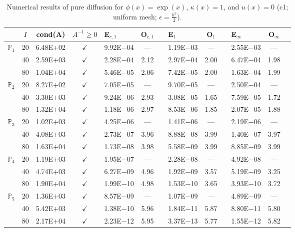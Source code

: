 \begin{table}[H]
\centering
\caption{Numerical results of pure diffusion for $\phi(x)=\exp(x)$, $\kappa(x)=1$, and $u(x)=0$ (c1; uniform mesh; $\epsilon=\frac{h^2}{2}$).}
\begin{tabular}{@{}l c c c l c c l c c l c c@{}}
\toprule
 & $I$ & cond(A) & $A^{-1}\geq 0$ &  E$_{c,1}$ & O$_{c,1}$ && E$_1$ & O$_1$ && E$_{\infty}$ & O$_{\infty}$\\
\midrule
\multirow{3}{*}{$\mathbb{P}_{1}$}
 & 20 & 6.48E$+$02 & $\checkmark$ & 9.92E$-$04 & --- && 1.19E$-$03 & --- && 2.55E$-$03 & ---\\
 & 40 & 2.59E$+$03 & $\checkmark$ & 2.28E$-$04 & 2.12 && 2.97E$-$04 & 2.00 && 6.47E$-$04 & 1.98\\
 & 80 & 1.04E$+$04 & $\checkmark$ & 5.46E$-$05 & 2.06 && 7.42E$-$05 & 2.00 && 1.63E$-$04 & 1.99\\
\midrule
\multirow{3}{*}{$\mathbb{P}_{2}$}
 & 20 & 8.27E$+$02 & $\checkmark$ & 7.05E$-$05 & --- && 9.70E$-$05 & --- && 2.50E$-$04 & ---\\
 & 40 & 3.30E$+$03 & $\checkmark$ & 9.24E$-$06 & 2.93 && 3.08E$-$05 & 1.65 && 7.59E$-$05 & 1.72\\
 & 80 & 1.32E$+$04 & $\checkmark$ & 1.18E$-$06 & 2.97 && 8.53E$-$06 & 1.85 && 2.07E$-$05 & 1.88\\
\midrule
\multirow{3}{*}{$\mathbb{P}_{3}$}
 & 20 & 1.02E$+$03 & $\checkmark$ & 4.25E$-$06 & --- && 1.41E$-$06 & --- && 2.19E$-$06 & ---\\
 & 40 & 4.08E$+$03 & $\checkmark$ & 2.73E$-$07 & 3.96 && 8.88E$-$08 & 3.99 && 1.40E$-$07 & 3.97\\
 & 80 & 1.63E$+$04 & $\checkmark$ & 1.73E$-$08 & 3.98 && 5.58E$-$09 & 3.99 && 8.85E$-$09 & 3.99\\
\midrule
\multirow{3}{*}{$\mathbb{P}_{4}$}
 & 20 & 1.19E$+$03 & $\checkmark$ & 1.95E$-$07 & --- && 2.28E$-$08 & --- && 4.92E$-$08 & ---\\
 & 40 & 4.74E$+$03 & $\checkmark$ & 6.27E$-$09 & 4.96 && 1.92E$-$09 & 3.57 && 5.19E$-$09 & 3.25\\
 & 80 & 1.90E$+$04 & $\checkmark$ & 1.99E$-$10 & 4.98 && 1.53E$-$10 & 3.65 && 3.93E$-$10 & 3.72\\
\midrule
\multirow{3}{*}{$\mathbb{P}_{5}$}
 & 20 & 1.36E$+$03 & $\checkmark$ & 8.57E$-$09 & --- && 1.07E$-$09 & --- && 4.89E$-$09 & ---\\
 & 40 & 5.42E$+$03 & $\checkmark$ & 1.38E$-$10 & 5.96 && 1.84E$-$11 & 5.87 && 8.80E$-$11 & 5.80\\
 & 80 & 2.17E$+$04 & $\checkmark$ & 2.23E$-$12 & 5.95 && 3.37E$-$13 & 5.77 && 1.55E$-$12 & 5.82\\
\bottomrule
\end{tabular}
\end{table}